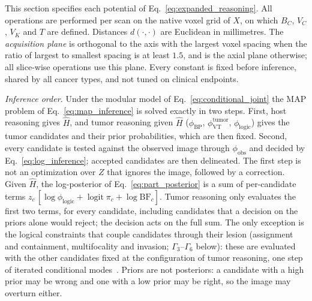 \documentclass[fleqn,10pt]{olplainarticle}
\begin{document}
This section specifies each potential of Eq.~\eqref{eq:expanded_reasoning}. All operations are performed per scan on the
native voxel grid of $X$, on which $B_C$, $V_C$, $V_K$ and $T$ are defined. Distances $d(\cdot,\cdot)$ are Euclidean in
millimetres. The \emph{acquisition plane} is orthogonal to the axis with the largest voxel spacing when the ratio of
largest to smallest spacing is at least $1.5$, and is the axial plane otherwise; all slice-wise operations use this plane.
Every constant is fixed before inference, shared by all cancer types, and not tuned on clinical endpoints.

\textit{Inference order.} Under the modular model of Eq.~\eqref{eq:conditional_joint} the MAP problem of
Eq.~\eqref{eq:map_inference} is solved exactly in two steps. First, host reasoning gives $\hat H$, and tumor reasoning
given $\hat H$ ($\phi_{\mathrm{BP}}$, $\phi^{\mathrm{tumor}}_{\mathrm{VT}}$, $\phi_{\mathrm{logic}}$) gives the tumor
candidates and their prior probabilities, which are then fixed. Second, every candidate is tested against the observed image
through $\phi_{\mathrm{obs}}$ and decided by Eq.~\eqref{eq:log_inference}; accepted candidates are then delineated.
The first step is not an optimization over $Z$ that ignores the image, followed by a correction. Given $\hat H$, the
log-posterior of Eq.~\eqref{eq:part_posterior} is a sum of per-candidate terms
$z_c\,[\log\phi_{\mathrm{logic}}+\operatorname{logit}\pi_c+\log\mathrm{BF}_c]$. Tumor reasoning only evaluates the first
two terms, for every candidate, including candidates that a decision on the priors alone would reject; the decision acts
on the full sum. The only exception is the logical constraints that couple candidates through their lesion (assignment and
containment, multifocality and invasion; $\Gamma_3$--$\Gamma_6$ below): these are evaluated with the other candidates
fixed at the configuration of tumor reasoning, one step of iterated conditional modes~\cite{besag1986statistical}.
Priors are not posteriors: a candidate with a high prior may be wrong and one with a low prior may be right, so the
image may overturn either.
\end{document}
